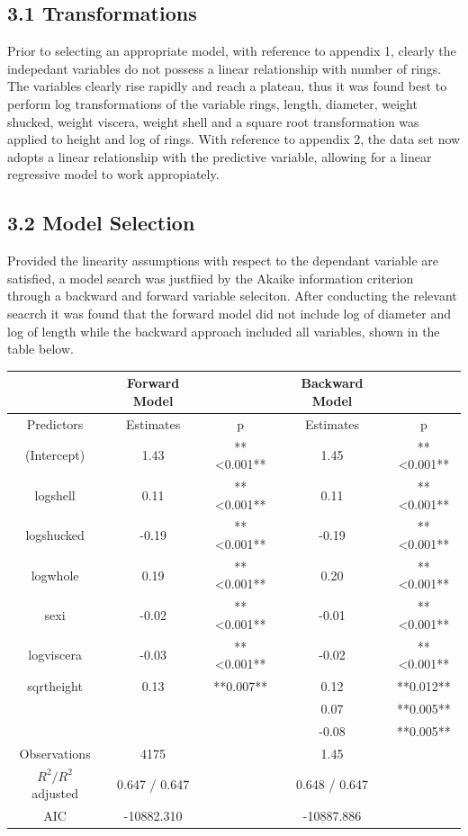 \documentclass[letterpaper,9pt,twocolumn,twoside,]{pinp}
\begin{document}
\subsection{3.1 Transformations}\label{transformations}

Prior to selecting an appropriate model, with reference to appendix 1,
clearly the indepedant variables do not possess a linear relationship
with number of rings. The variables clearly rise rapidly and reach a
plateau, thus it was found best to perform log transformations of the
variable rings, length, diameter, weight shucked, weight viscera, weight
shell and a square root transformation was applied to height and log of
rings. With reference to appendix 2, the data set now adopts a linear
relationship with the predictive variable, allowing for a linear
regressive model to work appropiately.

\subsection{3.2 Model Selection}\label{model-selection}

Provided the linearity assumptions with respect to the dependant
variable are satisfied, a model search was justfiied by the Akaike
information criterion through a backward and forward variable seleciton.
After conducting the relevant seacrch it was found that the forward
model did not include log of diameter and log of length while the
backward approach included all variables, shown in the table below.

\begin{center}
\begin{tabular}{c c c c c}
    & Forward Model & & Backward Model & \\
    \hline
    Predictors & Estimates & p & Estimates & p\\
    \hline
    (Intercept) & 1.43 & **<0.001** & 1.45 & **<0.001**\\
    logshell & 0.11 & **<0.001** & 0.11 & **<0.001**\\
    logshucked & -0.19 & **<0.001** & -0.19 & **<0.001**\\
    logwhole & 0.19 & **<0.001** & 0.20 & **<0.001**\\
    sexi & -0.02 & **<0.001** & -0.01 & **<0.001**\\
    logviscera & -0.03 & **<0.001** & -0.02 & **<0.001**\\
    sqrtheight & 0.13 & **0.007** & 0.12 & **0.012**\\
     &  & & 0.07 & **0.005**\\
     &  & & -0.08 & **0.005**\\
    \hline
    Observations & 4175 &  & 1.45 & \\
    $R^2/R^2$ adjusted & 0.647 / 0.647 & & 0.648 / 0.647 & \\
    AIC & -10882.310 & & -10887.886 & 
\end{tabular}
\end{center}
\end{document}
